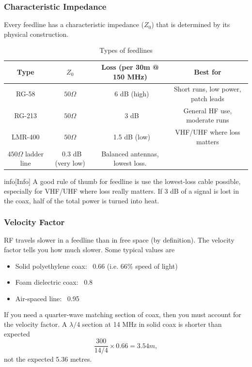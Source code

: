 \documentclass{article}
\begin{document}
\subsubsection{Characteristic Impedance}
Every feedline has a characteristic impedance ($Z_0$) that is determined by its physical construction.
\begin{table}[h]
    \centering
    \caption{Types of feedlines}
    \label{tab:7}
    \begin{tabular}{c|c|c|c}
        Type & $Z_0$ & Loss (per 30m @ 150 MHz) & Best for \\
        \hline
        \hline
        RG-58 & $50\Omega $ & ~6 dB (high) & Short runs, low power, patch leads \\
        RG-213 & $50\Omega $ & ~3 dB & General HF use, moderate runs \\
        LMR-400 & $50\Omega $ & ~1.5 dB (low) & VHF/UHF where loss matters \\
        $450\Omega $ ladder line & ~0.3 dB (very low) & Balanced antennas, lowest loss.
    \end{tabular}
\end{table}

\begin{callout}{info}[Info]
    A good rule of thumb for feedline is use the lowest-loss cable possible, especially for VHF/UHF where loss really matters. If 3 dB of a signal is lost in the coax, half of the total power is turned into heat.
\end{callout}

\subsubsection{Velocity Factor}
RF travels slower in a feedline than in free space (by definition). The velocity factor tells you how much slower. Some typical values are
\begin{itemize}
    \item Solid polyethylene coax: ~0.66 (i.e. 66\% speed of light)
    \item Foam dielectric coax: ~0.8
    \item Air-spaced line: ~0.95
\end{itemize}
If you need a quarter-wave matching section of coax, then you must account for the velocity factor. A $\lambda /4$ section at 14 MHz in solid coax is shorter than expected
\[
    \frac{300}{14/4}\times 0.66=3.54m,
\]
not the expected 5.36 metres.
\end{document}
